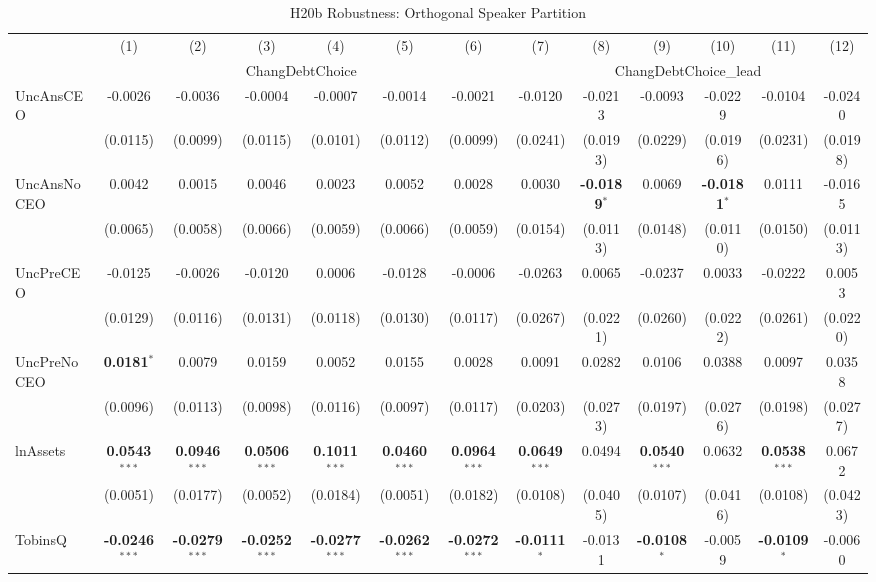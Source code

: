 \documentclass[11pt,a4paper]{article}
\begin{document}
\begin{table}[htbp]
\centering
\caption{H20b Robustness: Orthogonal Speaker Partition}
\label{tab:h20b_robust}
\scriptsize
\begin{tabular}{lcccccccccccc}
\toprule
 & (1) & (2) & (3) & (4) & (5) & (6) & (7) & (8) & (9) & (10) & (11) & (12) \\
 & \multicolumn{6}{c}{ChangDebtChoice} & \multicolumn{6}{c}{ChangDebtChoice\_lead} \\
\cmidrule(lr){2-7} \cmidrule(lr){8-13}
\midrule
UncAnsCEO & -0.0026 & -0.0036 & -0.0004 & -0.0007 & -0.0014 & -0.0021 & -0.0120 & -0.0213 & -0.0093 & -0.0229 & -0.0104 & -0.0240 \\
 & (0.0115) & (0.0099) & (0.0115) & (0.0101) & (0.0112) & (0.0099) & (0.0241) & (0.0193) & (0.0229) & (0.0196) & (0.0231) & (0.0198) \\
UncAnsNoCEO & 0.0042 & 0.0015 & 0.0046 & 0.0023 & 0.0052 & 0.0028 & 0.0030 & \textbf{-0.0189}$^{*}$ & 0.0069 & \textbf{-0.0181}$^{*}$ & 0.0111 & -0.0165 \\
 & (0.0065) & (0.0058) & (0.0066) & (0.0059) & (0.0066) & (0.0059) & (0.0154) & (0.0113) & (0.0148) & (0.0110) & (0.0150) & (0.0113) \\
UncPreCEO & -0.0125 & -0.0026 & -0.0120 & 0.0006 & -0.0128 & -0.0006 & -0.0263 & 0.0065 & -0.0237 & 0.0033 & -0.0222 & 0.0053 \\
 & (0.0129) & (0.0116) & (0.0131) & (0.0118) & (0.0130) & (0.0117) & (0.0267) & (0.0221) & (0.0260) & (0.0222) & (0.0261) & (0.0220) \\
UncPreNoCEO & \textbf{0.0181}$^{*}$ & 0.0079 & 0.0159 & 0.0052 & 0.0155 & 0.0028 & 0.0091 & 0.0282 & 0.0106 & 0.0388 & 0.0097 & 0.0358 \\
 & (0.0096) & (0.0113) & (0.0098) & (0.0116) & (0.0097) & (0.0117) & (0.0203) & (0.0273) & (0.0197) & (0.0276) & (0.0198) & (0.0277) \\
\midrule
lnAssets & \textbf{0.0543}$^{***}$ & \textbf{0.0946}$^{***}$ & \textbf{0.0506}$^{***}$ & \textbf{0.1011}$^{***}$ & \textbf{0.0460}$^{***}$ & \textbf{0.0964}$^{***}$ & \textbf{0.0649}$^{***}$ & 0.0494 & \textbf{0.0540}$^{***}$ & 0.0632 & \textbf{0.0538}$^{***}$ & 0.0672 \\
 & (0.0051) & (0.0177) & (0.0052) & (0.0184) & (0.0051) & (0.0182) & (0.0108) & (0.0405) & (0.0107) & (0.0416) & (0.0108) & (0.0423) \\
TobinsQ & \textbf{-0.0246}$^{***}$ & \textbf{-0.0279}$^{***}$ & \textbf{-0.0252}$^{***}$ & \textbf{-0.0277}$^{***}$ & \textbf{-0.0262}$^{***}$ & \textbf{-0.0272}$^{***}$ & \textbf{-0.0111}$^{*}$ & -0.0131 & \textbf{-0.0108}$^{*}$ & -0.0059 & \textbf{-0.0109}$^{*}$ & -0.0060 \\

\end{tabular}
\end{table}
\end{document}
